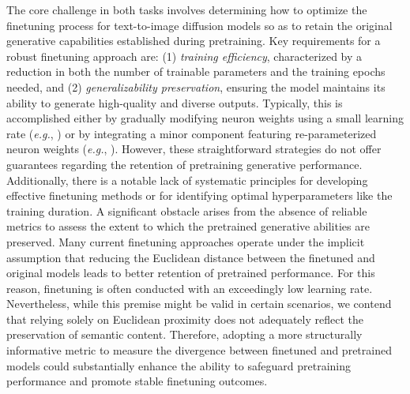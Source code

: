 The core challenge in both tasks involves determining how to optimize the finetuning process for text-to-image diffusion models so as to retain the original generative capabilities established during pretraining. Key requirements for a robust finetuning approach are: (1) \emph{training efficiency}, characterized by a reduction in both the number of trainable parameters and the training epochs needed, and (2) \emph{generalizability preservation}, ensuring the model maintains its ability to generate high-quality and diverse outputs. Typically, this is accomplished either by gradually modifying neuron weights using a small learning rate (\emph{e.g.}, \cite{ruiz2023dreambooth}) or by integrating a minor component featuring re-parameterized neuron weights (\emph{e.g.}, \cite{hulora2022,zhang2023adding}). However, these straightforward strategies do not offer guarantees regarding the retention of pretraining generative performance. Additionally, there is a notable lack of systematic principles for developing effective finetuning methods or for identifying optimal hyperparameters like the training duration. A significant obstacle arises from the absence of reliable metrics to assess the extent to which the pretrained generative abilities are preserved. Many current finetuning approaches operate under the implicit assumption that reducing the Euclidean distance between the finetuned and original models leads to better retention of pretrained performance. For this reason, finetuning is often conducted with an exceedingly low learning rate. Nevertheless, while this premise might be valid in certain scenarios, we contend that relying solely on Euclidean proximity does not adequately reflect the preservation of semantic content. Therefore, adopting a more structurally informative metric to measure the divergence between finetuned and pretrained models could substantially enhance the ability to safeguard pretraining performance and promote stable finetuning outcomes.

